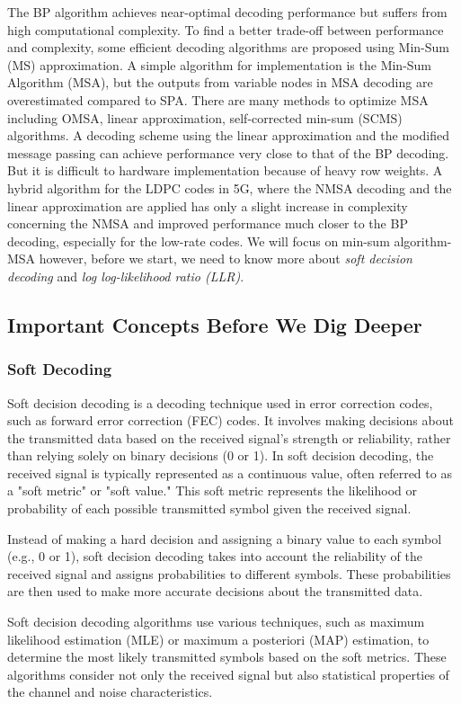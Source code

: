 The BP algorithm achieves near-optimal decoding performance but suffers from high computational complexity. To ﬁnd a better trade-oﬀ between performance and complexity, some efficient decoding algorithms are proposed using Min-Sum (MS) approximation. A simple algorithm for implementation is the Min-Sum Algorithm (MSA), but the outputs from variable nodes in MSA decoding are overestimated compared to SPA. There are many methods to optimize MSA including OMSA, linear approximation, self-corrected min-sum (SCMS) algorithms. A decoding scheme using the linear approximation and the modified message passing can achieve performance very close to that of the BP decoding. But it is difficult to hardware implementation because of heavy row weights. A hybrid algorithm for the LDPC codes in 5G, where the NMSA decoding and the linear approximation are applied has only a slight increase in complexity concerning the NMSA and improved performance much closer to the BP decoding, especially for the low-rate codes. We will focus on min-sum algorithm-MSA however, before we start, we need to know more about \emph{soft decision decoding} and \emph{log log-likelihood ratio (LLR)}.

\subsection{Important Concepts Before We Dig Deeper}
\subsubsection{Soft Decoding}
Soft decision decoding is a decoding technique used in error correction codes, such as forward error correction (FEC) codes. It involves making decisions about the transmitted data based on the received signal's strength or reliability, rather than relying solely on binary decisions (0 or 1).
In soft decision decoding, the received signal is typically represented as a continuous value, often referred to as a "soft metric" or "soft value." This soft metric represents the likelihood or probability of each possible transmitted symbol given the received signal.

Instead of making a hard decision and assigning a binary value to each symbol (e.g., 0 or 1), soft decision decoding takes into account the reliability of the received signal and assigns probabilities to different symbols. These probabilities are then used to make more accurate decisions about the transmitted data.

Soft decision decoding algorithms use various techniques, such as maximum likelihood estimation (MLE) or maximum a posteriori (MAP) estimation, to determine the most likely transmitted symbols based on the soft metrics. These algorithms consider not only the received signal but also statistical properties of the channel and noise characteristics.

